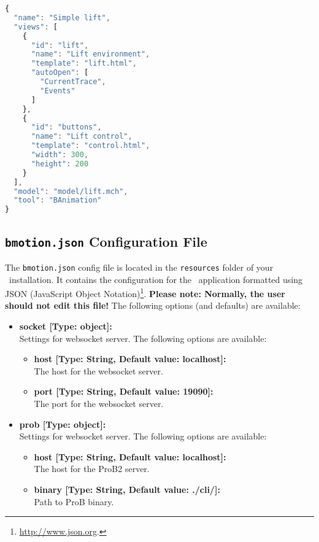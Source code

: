 \begin{lstlisting}[language=JavaScript]
{
  "name": "Simple lift",
  "views": [
    {
      "id": "lift",
      "name": "Lift environment",
      "template": "lift.html",
      "autoOpen": [
        "CurrentTrace",
        "Events"
      ]
    },
    {
      "id": "buttons",
      "name": "Lift control",
      "template": "control.html",
      "width": 300,
      "height": 200
    }
  ],
  "model": "model/lift.mch",
  "tool": "BAnimation"
}
\end{lstlisting}

\subsection{\texttt{bmotion.json} Configuration File}
\label{sec:configfile}

The \texttt{bmotion.json} config file is located in the \texttt{resources} folder of your \bms\ installation.
It contains the configuration for the \bms\ application formatted using JSON (JavaScript Object Notation)\footnote{\url{http://www.json.org}.}.
\textbf{Please note: Normally, the user should not edit this file!}
The following options (and defaults) are available:

\begin{itemize}

	\item[] \textbf{socket [Type: object]:}\\ Settings for websocket server. The following options are available:
	\begin{itemize}
		\item[] \textbf{host [Type: String, Default value: localhost]:}\\ The host for the websocket server.
		\item[] \textbf{port [Type: String, Default value: 19090]:}\\ The port for the websocket server.
	\end{itemize}

	\item[] \textbf{prob [Type: object]:}\\ Settings for websocket server. The following options are available:
	\begin{itemize}
		\item[] \textbf{host [Type: String, Default value: localhost]:}\\ The host for the ProB2 server.
		\item[] \textbf{binary [Type: String, Default value: ./cli/]:}\\ Path to ProB binary.
	\end{itemize}

\end{itemize}